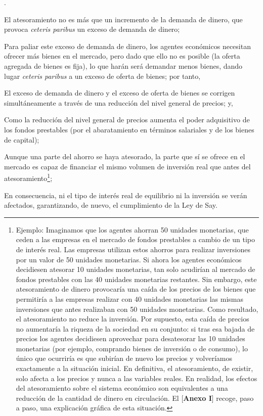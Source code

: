 \documentclass[10pt,a4paper]{article}
\newcounter{numitem}
\newenvironment{lnum}
      {\begin{list}{\arabic{numitem}.}{%
          \usecounter{numitem}%
          \setlength{\leftmargin}{1cm}%
          \setlength{\parskip}{3pt}%
          \setlength{\itemsep}{0pt}%
          \setlength{\parsep}{0pt}%
      }}
      {\end{list}}
\begin{document}
\begin{lnum}
    \item El atesoramiento no es más que un incremento de la demanda de dinero, que provoca \textit{ceteris paribus} un exceso de demanda de dinero;
    \item Para paliar este exceso de demanda de dinero, los agentes económicos necesitan ofrecer más bienes en el mercado, pero dado que ello no es posible (la oferta agregada de bienes es fija), lo que harán será demandar menos bienes, dando lugar \textit{ceteris paribus} a un exceso de oferta de bienes; por tanto,
    \item El exceso de demanda de dinero y el exceso de oferta de bienes se corrigen simultáneamente a través de una reducción del nivel general de precios; y,
    \item Como la reducción del nivel general de precios aumenta el poder adquisitivo de los fondos prestables (por el abaratamiento en términos salariales y de los bienes de capital);
    \item Aunque una parte del ahorro se haya atesorado, la parte que sí se ofrece en el mercado es capaz de financiar el mismo volumen de inversión real que antes del atesoramiento\footnote{%
        Ejemplo: Imaginamos que los agentes ahorran 50 unidades monetarias, que ceden a las empresas en el mercado de fondos prestables a cambio de un tipo de interés real. Las empresas utilizan estos ahorros para realizar inversiones por un valor de 50 unidades monetarias. Si ahora los agentes económicos decidiesen atesorar 10 unidades monetarias, tan solo acudirían al mercado de fondos prestables con las 40 unidades monetarias restantes. Sin embargo, este atesoramiento de dinero provocaría una caída de los precios de los bienes que permitiría a las empresas realizar con 40 unidades monetarias las mismas inversiones que antes realizaban con 50 unidades monetarias. Como resultado, el atesoramiento no reduce la inversión. Por supuesto, esta caída de precios no aumentaría la riqueza de la sociedad en su conjunto: si tras esa bajada de precios los agentes decidiesen aprovechar para desatesorar las 10 unidades monetarias (por ejemplo, comprando bienes de inversión o de consumo), lo único que ocurriría es que subirían de nuevo los precios y volveríamos exactamente a la situación inicial. En definitiva, el atesoramiento, de existir, solo afecta a los precios y nunca a las variables reales. En realidad, los efectos del atesoramiento sobre el sistema económico son equivalentes a una reducción de la cantidad de dinero en circulación. El [\textbf{Anexo I}] recoge, paso a paso, una explicación gráfica de esta situación.
    };
    \item En consecuencia, ni el tipo de interés real de equilibrio ni la inversión se verán afectados, garantizando, de nuevo, el cumplimiento de la Ley de Say. 
\end{lnum}
\end{document}
